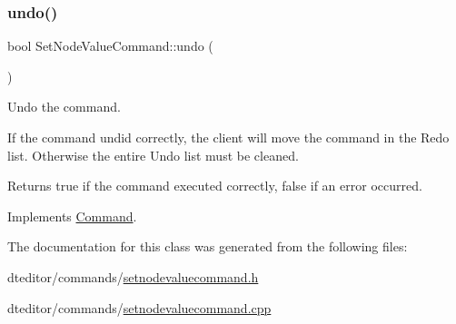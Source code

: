 \subsubsection{\texorpdfstring{undo()}{undo()}}
{\footnotesize\ttfamily bool Set\+Node\+Value\+Command\+::undo (\begin{DoxyParamCaption}{ }\end{DoxyParamCaption})\hspace{0.3cm}{\ttfamily [virtual]}}



Undo the command. 

If the command undid correctly, the client will move the command in the Redo list. Otherwise the entire Undo list must be cleaned. \begin{DoxyReturn}{Returns}
true if the command executed correctly, false if an error occurred. 
\end{DoxyReturn}


Implements \mbox{\hyperlink{class_command_aa89348c98fd2194f1617d70f57a3ae6c}{Command}}.



The documentation for this class was generated from the following files\+:\begin{DoxyCompactItemize}
\item 
dteditor/commands/\mbox{\hyperlink{setnodevaluecommand_8h}{setnodevaluecommand.\+h}}\item 
dteditor/commands/\mbox{\hyperlink{setnodevaluecommand_8cpp}{setnodevaluecommand.\+cpp}}\end{DoxyCompactItemize}
